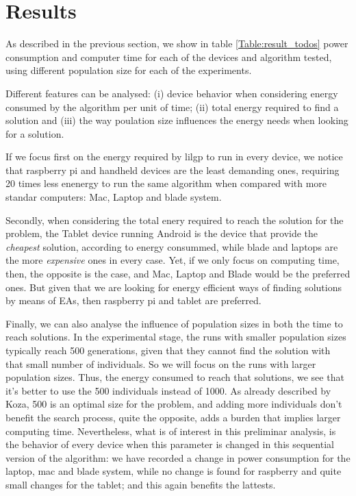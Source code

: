 \section{Results}
\label{results}

As described in the previous section, we show in table \ref{Table:result_todos} power consumption and computer time for each of the devices and algorithm tested, using different population size for each of the experiments.  

Different features can be analysed:  (i) device behavior when considering energy consumed by the algorithm per unit of time; (ii) total energy required to find a solution and (iii) the way poulation size influences the energy needs when looking for a solution.

If we focus first on the energy required by lilgp to run in every device, we notice that raspberry pi and handheld devices are the least demanding ones, requiring 20 times less enenergy to run the same algorithm when compared with more standar computers:  Mac, Laptop and blade system.

Secondly, when considering the total enery required to reach the solution for the problem, the Tablet device running Android is the device that provide the \textit{cheapest} solution, according to energy consummed, while blade and laptops are the more \textit{expensive} ones in every case.  Yet, if we only focus on computing time, then, the opposite is the case, and Mac, Laptop and Blade would be the preferred ones.  But given that we are looking for energy efficient ways of finding solutions by means of EAs, then raspberry pi and tablet are preferred.

Finally, we can also analyse the influence of population sizes in both the time to reach solutions.  In the experimental stage, the runs with smaller population sizes typically reach 500 generations, given that they cannot find the solution with that small number of individuals.  So we will focus on the runs with larger population sizes.  Thus, the energy consumed to reach that solutions, we see that it's better to use the 500 individuals instead of 1000.  As already described by Koza, 500 is an optimal size for the problem, and adding more individuals don't benefit the search process, quite the opposite, adds a burden that implies larger computing time.  Nevertheless, what is of interest in this preliminar analysis, is the behavior of every device when this parameter is changed in this sequential version of the algorithm:  we have recorded a change in power consumption for the laptop, mac and blade system, while no change is found for raspberry and quite small changes for the tablet;  and this again benefits the lattests.  





